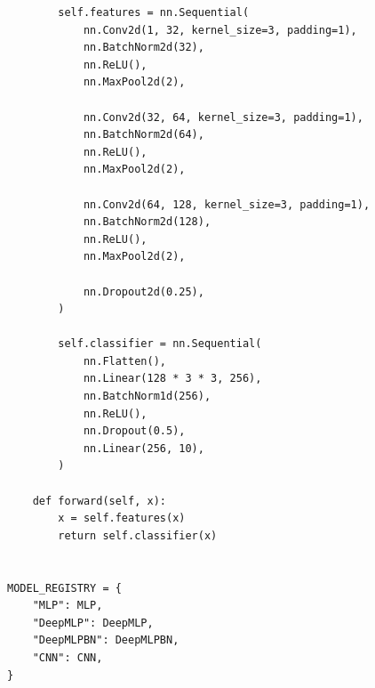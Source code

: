 \begin{verbatim}
        self.features = nn.Sequential(
            nn.Conv2d(1, 32, kernel_size=3, padding=1),
            nn.BatchNorm2d(32),
            nn.ReLU(),
            nn.MaxPool2d(2),

            nn.Conv2d(32, 64, kernel_size=3, padding=1),
            nn.BatchNorm2d(64),
            nn.ReLU(),
            nn.MaxPool2d(2),

            nn.Conv2d(64, 128, kernel_size=3, padding=1),
            nn.BatchNorm2d(128),
            nn.ReLU(),
            nn.MaxPool2d(2),

            nn.Dropout2d(0.25),
        )

        self.classifier = nn.Sequential(
            nn.Flatten(),
            nn.Linear(128 * 3 * 3, 256),
            nn.BatchNorm1d(256),
            nn.ReLU(),
            nn.Dropout(0.5),
            nn.Linear(256, 10),
        )

    def forward(self, x):
        x = self.features(x)
        return self.classifier(x)


MODEL_REGISTRY = {
    "MLP": MLP,
    "DeepMLP": DeepMLP,
    "DeepMLPBN": DeepMLPBN,
    "CNN": CNN,
}

\end{verbatim}
